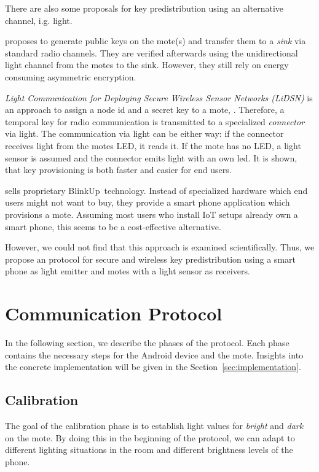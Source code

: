 \documentclass{sig-alternate} %
\begin{document}
There are also some proposals for key predistribution using an alternative channel, i.g. light.

\cite{saxena2009blink} proposes to generate public keys on the mote(s) and transfer them to a \textit{sink} via standard radio channels.
They are verified afterwards using the unidirectional light channel from the motes to the sink.
However, they still rely on energy consuming asymmetric encryption.

\textit{Light Communication for Deploying Secure Wireless Sensor Networks (LiDSN)} is an approach to assign a node id and a secret key to a mote, \cite{doan2012lidsn}.
Therefore, a temporal key for radio communication is transmitted to a specialized \textit{connector} via light.
The communication via light can be either way: if the connector receives light from the motes LED, it reads it. If the mote has no LED, a light sensor is assumed and the connector emits light with an own led.
It is shown, that key provisioning is both faster and easier for end users.

\cite{electricimp} sells proprietary BlinkUp~\texttrademark  technology.
Instead of specialized hardware which end users might not want to buy, they provide a smart phone application which provisions a mote.
Assuming most users who install IoT setups already own a smart phone, this seems to be a cost-effective alternative.

However, we could not find that this approach is examined scientifically.
Thus, we propose an protocol for secure and wireless key predistribution using a smart phone as light emitter and motes with a light sensor as receivers.

\section{Communication Protocol}
\label{sec:communication_protocol}

In the following section, we describe the phases of the protocol.
Each phase contains the necessary steps for the Android device and the mote.
Insights into the concrete implementation will be given in the Section~\ref{sec:implementation}.

\subsection{Calibration}
\label{sub:calibration}

The goal of the calibration phase is to establish light values for \textit{bright} and \textit{dark} on the mote.
By doing this in the beginning of the protocol, we can adapt to different lighting situations in the room and different brightness levels of the phone.
\end{document}
